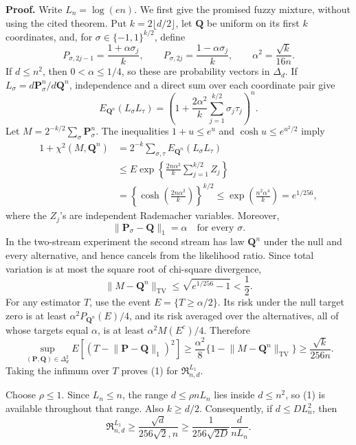 \textbf{Proof.}
Write \(L_n=\log(en)\).  We first give the promised fuzzy mixture, without using the cited theorem.  Put \(k=2\lfloor d/2\rfloor\), let \(\mathbf Q\) be uniform on its first \(k\) coordinates, and, for \(\sigma\in\{-1,1\}^{k/2}\), define
\[
 P_{\sigma,2j-1}=\frac{1+\alpha\sigma_j}{k},
 \qquad
 P_{\sigma,2j}=\frac{1-\alpha\sigma_j}{k},
 \qquad
 \alpha^2=\frac{\sqrt{k}}{16n}.
\]
If \(d\leq n^2\), then \(0<\alpha\leq1/4\), so these are probability vectors in \(\Delta_d\).  If \(L_\sigma=d\mathbf P_\sigma^n/d\mathbf Q^n\), independence and a direct sum over each coordinate pair give
\[
 E_{\mathbf Q^n}(L_\sigma L_\tau)
 =\left(1+\frac{2\alpha^2}{k}
       \sum_{j=1}^{k/2}\sigma_j\tau_j\right)^n.
\]
Let \(M=2^{-k/2}\sum_\sigma\mathbf P_\sigma^n\).  The inequalities \(1+u\leq e^u\) and \(\cosh u\leq e^{u^2/2}\) imply
\[
 \begin{aligned}
 1+\chi^2(M,\mathbf Q^n)
 &=2^{-k}\sum_{\sigma,\tau}E_{\mathbf Q^n}(L_\sigma L_\tau)\\
 &\leq E\exp\!\left\{
       \frac{2n\alpha^2}{k}\sum_{j=1}^{k/2}Z_j
      \right\}\\
 &=\left\{\cosh\!\left(\frac{2n\alpha^2}{k}\right)\right\}^{k/2}
 \leq\exp\!\left(\frac{n^2\alpha^4}{k}\right)
 =e^{1/256},
 \end{aligned}
\]
where the \(Z_j\)'s are independent Rademacher variables.  Moreover,
\[
 \lVert\mathbf P_\sigma-\mathbf Q\rVert_1=\alpha
 \quad\text{for every }\sigma.
\]
In the two-stream experiment the second stream has law \(\mathbf Q^n\) under the null and every alternative, and hence cancels from the likelihood ratio.  Since total variation is at most the square root of chi-square divergence,
\[
 \lVert M-\mathbf Q^n\rVert_{\mathrm{TV}}
 \leq\sqrt{e^{1/256}-1}<\frac12.
\]
For any estimator \(T\), use the event \(E=\{T\geq\alpha/2\}\).  Its risk under the null target zero is at least \(\alpha^2P_{\mathbf Q^n}(E)/4\), and its risk averaged over the alternatives, all of whose targets equal \(\alpha\), is at least \(\alpha^2M(E^c)/4\).  Therefore
\[
 \sup_{(\mathbf P,\mathbf Q)\in\Delta_d^2}
 E[(T-\lVert\mathbf P-\mathbf Q\rVert_1)^2]
 \geq\frac{\alpha^2}{8}
       \{1-\lVert M-\mathbf Q^n\rVert_{\mathrm{TV}}\}
 \geq\frac{\sqrt{k}}{256n}.
 \tag{1}
\]
Taking the infimum over \(T\) proves (1) for \(\mathfrak R^{L_1}_{n,d}\).

Choose \(\rho\leq1\).  Since \(L_n\leq n\), the range \(d\leq\rho nL_n\) lies inside \(d\leq n^2\), so (1) is available throughout that range.  Also \(k\geq d/2\).  Consequently, if \(d\leq D L_n^2\), then
\[
 \mathfrak R^{L_1}_{n,d}
 \geq\frac{\sqrt d}{256\sqrt2,n}
 \geq\frac{1}{256\sqrt{2D}}
       \frac{d}{nL_n}.
 \tag{2}
\]

